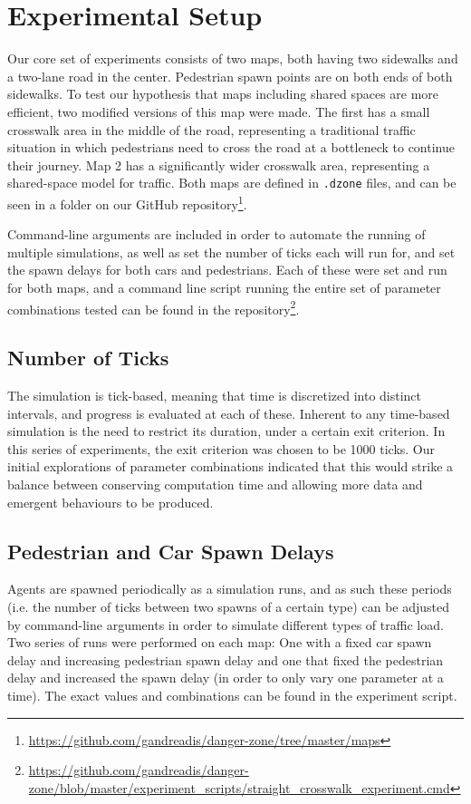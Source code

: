 \chapter{Experimental Setup} \label{chap:setup}

Our core set of experiments consists of two maps, both having two sidewalks and a two-lane road in the center. Pedestrian spawn points are on both ends of both sidewalks. To test our hypothesis that maps including shared spaces are more efficient, two modified versions of this map were made. The first has a small crosswalk area in the middle of the road, representing a traditional traffic situation in which pedestrians need to cross the road at a bottleneck to continue their journey. Map 2 has a significantly wider crosswalk area, representing a shared-space model for traffic. Both maps are defined in \texttt{.dzone} files, and can be seen in a folder on our GitHub repository\footnote{\url{https://github.com/gandreadis/danger-zone/tree/master/maps}}.

Command-line arguments are included in order to automate the running of multiple simulations, as well as set the number of ticks each will run for, and set the spawn delays for both cars and pedestrians.  Each of these were set and run for both maps, and a command line script running the entire set of parameter combinations tested can be found in the repository\footnote{\url{https://github.com/gandreadis/danger-zone/blob/master/experiment_scripts/straight_crosswalk_experiment.cmd}}.

\section{Number of Ticks}
The simulation is tick-based, meaning that time is discretized into distinct intervals, and progress is evaluated at each of these. Inherent to any time-based simulation is the need to restrict its duration, under a certain exit criterion. In this series of experiments, the exit criterion was chosen to be 1000 ticks. Our initial explorations of parameter combinations indicated that this would strike a balance between conserving computation time and allowing more data and emergent behaviours to be produced.

\section{Pedestrian and Car Spawn Delays}
Agents are spawned periodically as a simulation runs, and as such these periods (i.e. the number of ticks between two spawns of a certain type) can be adjusted by command-line arguments in order to simulate different types of traffic load. Two series of runs were performed on each map: One with a fixed car spawn delay and increasing pedestrian spawn delay and one that fixed the pedestrian delay and increased the spawn delay (in order to only vary one parameter at a time). The exact values and combinations can be found in the experiment script.

